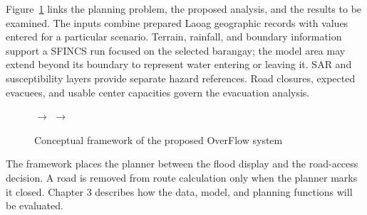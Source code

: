 Figure~\ref{fig:overflow-framework} links the planning problem, the proposed analysis, and the results to be examined. The inputs combine prepared Laoag geographic records with values entered for a particular scenario. Terrain, rainfall, and boundary information support a SFINCS run focused on the selected barangay; the model area may extend beyond its boundary to represent water entering or leaving it. SAR and susceptibility layers provide separate hazard references. Road closures, expected evacuees, and usable center capacities govern the evacuation analysis.

\begin{figure}[htbp]
\centering
\setlength{\fboxsep}{5pt}
\hspace{0.01\linewidth}$\longrightarrow$\hspace{0.01\linewidth}
\hspace{0.01\linewidth}$\longrightarrow$\hspace{0.01\linewidth}
\caption{Conceptual framework of the proposed OverFlow system}
\label{fig:overflow-framework}
\end{figure}

The framework places the planner between the flood display and the road-access decision. A road is removed from route calculation only when the planner marks it closed. Chapter 3 describes how the data, model, and planning functions will be evaluated.
